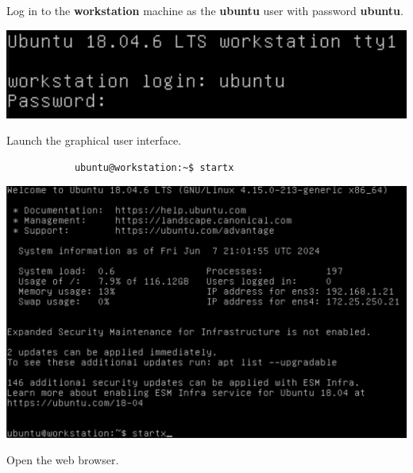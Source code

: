 \documentclass[letterpaper, 12pt]{article}
\begin{document}
\begin{enumerate}
    \begin{labstep}
        Log in to the \textbf{workstation} machine as the \textbf{ubuntu} user with password \textbf{ubuntu}.

        \begin{center}
            \includegraphics[width=\linewidth]{images/part1/step1.png}
        \end{center}
    \end{labstep}

    \begin{labstep}
        Launch the graphical user interface.
        \begin{lstlisting}
            ubuntu@workstation:~$ startx
        \end{lstlisting}

        \begin{center}
            \includegraphics[width=\linewidth]{images/part1/step2.png}
        \end{center}
    \end{labstep}

    \begin{labstep}
        Open the web browser.


\end{labstep}
\end{enumerate}
\end{document}
